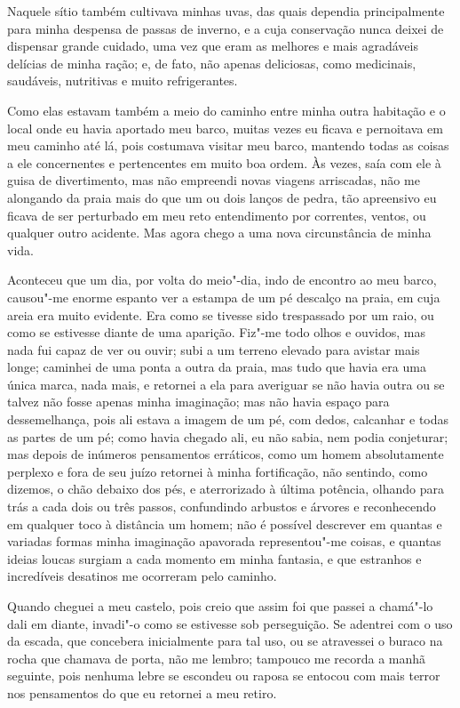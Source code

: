 Naquele sítio também cultivava minhas uvas, das quais dependia
principalmente para minha despensa de passas de inverno, e a cuja
conservação nunca deixei de dispensar grande cuidado, uma vez que eram
as melhores e mais agradáveis delícias de minha ração; e, de fato, não
apenas deliciosas, como medicinais, saudáveis, nutritivas e muito
refrigerantes.

Como elas estavam também a meio do caminho entre minha outra habitação e
o local onde eu havia aportado meu barco, muitas vezes eu ficava e
pernoitava em meu caminho até lá, pois costumava visitar meu barco,
mantendo todas as coisas a ele concernentes e pertencentes em muito boa
ordem. Às vezes, saía com ele à guisa de divertimento, mas não empreendi
novas viagens arriscadas, não me alongando da praia mais do que um ou
dois lanços de pedra, tão apreensivo eu ficava de ser perturbado em meu
reto entendimento por correntes, ventos, ou qualquer outro acidente. Mas
agora chego a uma nova circunstância de minha vida.

Aconteceu que um dia, por volta do meio"-dia, indo de encontro ao meu
barco, causou"-me enorme espanto ver a estampa de um pé descalço na
praia, em cuja areia era muito evidente. Era como se tivesse sido
trespassado por um raio, ou como se estivesse diante de uma aparição.
Fiz"-me todo olhos e ouvidos, mas nada fui capaz de ver ou ouvir; subi a
um terreno elevado para avistar mais longe; caminhei de uma ponta a
outra da praia, mas tudo que havia era uma única marca, nada mais, e
retornei a ela para averiguar se não havia outra ou se talvez não fosse
apenas minha imaginação; mas não havia espaço para dessemelhança, pois
ali estava a imagem de um pé, com dedos, calcanhar e todas as partes de
um pé; como havia chegado ali, eu não sabia, nem podia conjeturar; mas
depois de inúmeros pensamentos erráticos, como um homem absolutamente
perplexo e fora de seu juízo retornei à minha fortificação, não
sentindo, como dizemos, o chão debaixo dos pés, e aterrorizado à última
potência, olhando para trás a cada dois ou três passos, confundindo
arbustos e árvores e reconhecendo em qualquer toco à distância um homem;
não é possível descrever em quantas e variadas formas minha imaginação
apavorada representou"-me coisas, e quantas ideias loucas surgiam a cada
momento em minha fantasia, e que estranhos e incredíveis desatinos me
ocorreram pelo caminho.

Quando cheguei a meu castelo, pois creio que assim foi que passei a
chamá"-lo dali em diante, invadi"-o como se estivesse sob perseguição. Se
adentrei com o uso da escada, que concebera inicialmente para tal uso,
ou se atravessei o buraco na rocha que chamava de porta, não me lembro;
tampouco me recorda a manhã seguinte, pois nenhuma lebre se escondeu ou
raposa se entocou com mais terror nos pensamentos do que eu retornei a
meu retiro.

